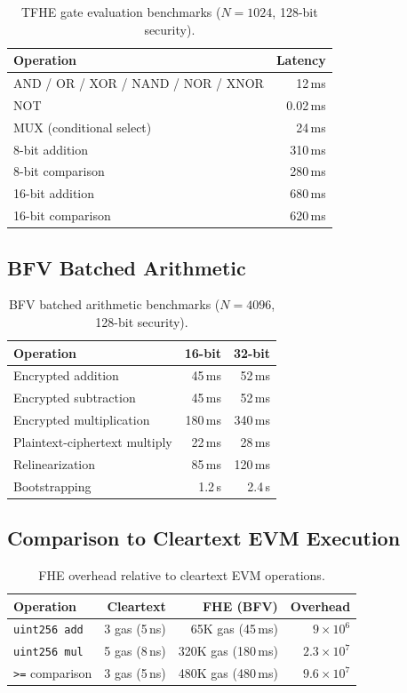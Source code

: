 \documentclass[11pt,a4paper]{article}
\begin{document}
\begin{table}[ht]
\centering
\caption{TFHE gate evaluation benchmarks ($N = 1024$, 128-bit security).}
\label{tab:tfhe-benchmarks}
\begin{tabular}{lr}
\toprule
\textbf{Operation} & \textbf{Latency} \\
\midrule
AND / OR / XOR / NAND / NOR / XNOR & 12\,ms \\
NOT & 0.02\,ms \\
MUX (conditional select) & 24\,ms \\
8-bit addition & 310\,ms \\
8-bit comparison & 280\,ms \\
16-bit addition & 680\,ms \\
16-bit comparison & 620\,ms \\
\bottomrule
\end{tabular}
\end{table}

\subsection{BFV Batched Arithmetic}

\begin{table}[ht]
\centering
\caption{BFV batched arithmetic benchmarks ($N = 4096$, 128-bit security).}
\label{tab:bfv-benchmarks}
\begin{tabular}{lrr}
\toprule
\textbf{Operation} & \textbf{16-bit} & \textbf{32-bit} \\
\midrule
Encrypted addition & 45\,ms & 52\,ms \\
Encrypted subtraction & 45\,ms & 52\,ms \\
Encrypted multiplication & 180\,ms & 340\,ms \\
Plaintext-ciphertext multiply & 22\,ms & 28\,ms \\
Relinearization & 85\,ms & 120\,ms \\
Bootstrapping & 1.2\,s & 2.4\,s \\
\bottomrule
\end{tabular}
\end{table}

\subsection{Comparison to Cleartext EVM Execution}

\begin{table}[ht]
\centering
\caption{FHE overhead relative to cleartext EVM operations.}
\label{tab:overhead}
\begin{tabular}{lrrr}
\toprule
\textbf{Operation} & \textbf{Cleartext} & \textbf{FHE (BFV)} & \textbf{Overhead} \\
\midrule
\texttt{uint256 add} & 3 gas (5\,ns) & 65K gas (45\,ms) & $9 \times 10^6$ \\
\texttt{uint256 mul} & 5 gas (8\,ns) & 320K gas (180\,ms) & $2.3 \times 10^7$ \\
\texttt{>=} comparison & 3 gas (5\,ns) & 480K gas (480\,ms) & $9.6 \times 10^7$ \\
\bottomrule
\end{tabular}
\end{table}
\end{document}
